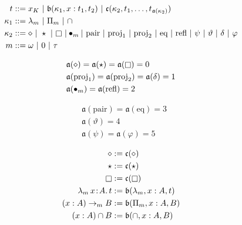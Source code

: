 
\begin{figure}
    \centering
    \begin{align*}
        t &::= x_K\ |\ \mathfrak{b}(\kappa_1, x : t_1, t_2)\ |\ \mathfrak{c}(\kappa_2, t_1, \ldots, t_{\mathfrak{a}(\kappa_2)}) \\
        \kappa_1 &::= \lambda_m\ |\ \Pi_m\ |\ \cap \\
        \kappa_2 &::=\diamond\ |\ \star\ |\ \kind\ | \bullet_m |\ \text{pair}\ |\ \text{proj}_1\ |\ \text{proj}_2\ |\ \text{eq}\ |\ \text{refl}\ |\ \psi\ |\ \vartheta\ |\ \delta\ |\ \varphi  \\
        m &::= \omega\ |\ 0\ |\ \tau
    \end{align*}
    \vspace{-.3in}
    \begin{minipage}{0.5\textwidth}
        \begin{align*}
            &\mathfrak{a}(\diamond) = \mathfrak{a}(\star) = \mathfrak{a}(\kind) = 0 \\
            &\mathfrak{a}(\text{proj}_1) = \mathfrak{a}(\text{proj}_2) = \mathfrak{a}(\delta) = 1 \\
            &\mathfrak{a}(\bullet_m) = \mathfrak{a}(\text{refl}) = 2
        \end{align*}
    \end{minipage}%
    \begin{minipage}{0.5\textwidth}
        \begin{align*}
            &\mathfrak{a}(\text{pair}) = \mathfrak{a}(\text{eq}) = 3 \\
            &\mathfrak{a}(\vartheta) = 4 \\
            &\mathfrak{a}(\psi) = \mathfrak{a}(\varphi) =  5
        \end{align*}
    \end{minipage}
    \begin{minipage}{0.5\textwidth}
        \begin{align*}
            \diamond &:= \mathfrak{c}(\diamond) \\
            \star &:= \mathfrak{c}(\star) \\
            \kind &:= \mathfrak{c}(\kind) \\
            \abs{\lambda_m}{x}{A}{t} &:= \mathfrak{b}(\lambda_m, x : A, t) \\
            (x : A) \to_m B &:= \mathfrak{b}(\Pi_m, x : A, B) \\
            (x : A) \cap B &:= \mathfrak{b}(\cap, x : A, B) \\

\end{align*}
\end{minipage}
\end{figure}
